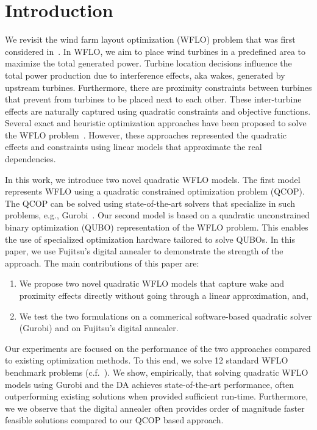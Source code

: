 \documentclass[preprint,12pt]{elsarticle}
\begin{document}
\maketitle 

\section{Introduction}

We revisit 
the wind farm layout optimization (WFLO) problem 
that was first considered 
in~\citet{MOSETTI1994105}. 
In WFLO, we aim to place wind turbines 
in a predefined area to maximize 
the total generated power. 
Turbine location decisions    
influence
the
total power production due to  
interference effects, aka wakes, generated by upstream 
turbines. Furthermore, 
there are proximity constraints between turbines
that prevent from turbines to be placed next to each other.
These inter-turbine effects 
are naturally captured using quadratic constraints and objective
functions. Several exact and heuristic optimization approaches have 
been proposed to solve
the WFLO problem~\cite{turner2014new,Zhang2014}. However, these
approaches represented the quadratic effects and constraints
using linear models that approximate the real dependencies. 

In this work, we introduce two 
novel quadratic WFLO models. The first model 
represents WFLO using a 
quadratic constrained optimization problem (QCOP). 
The QCOP can be solved using state-of-the-art solvers that
specialize in such problems, e.g., Gurobi~\cite{guorbi}. 
Our second model is based on a quadratic unconstrained binary optimization (QUBO) representation of the WFLO 
problem.
This enables the use of specialized optimization hardware tailored to solve
QUBOs. In this paper, we use Fujitsu's digital annealer to demonstrate the strength
of the approach. The main contributions of this paper are: 
\begin{enumerate} 
\item We propose two novel quadratic WFLO models that capture wake and proximity
effects directly without going through a linear approximation, and, 
\item We test the two formulations
on a commerical software-based quadratic solver (Gurobi) and on Fujitsu's digital 
annealer. 
\end{enumerate} Our experiments are focused on the performance of the two approaches
compared to 
existing optimization methods. To this end,
we solve 12 standard WFLO benchmark problems (c.f.~\cite{turner2014new}). 
We show, empirically, that solving quadratic WFLO models
using Gurobi and the DA
achieves state-of-the-art performance, often outperforming
existing solutions when provided sufficient run-time. Furthermore, we
we observe that the digital 
annealer often provides order of magnitude faster feasible solutions
compared to our QCOP based approach.
\end{document}
